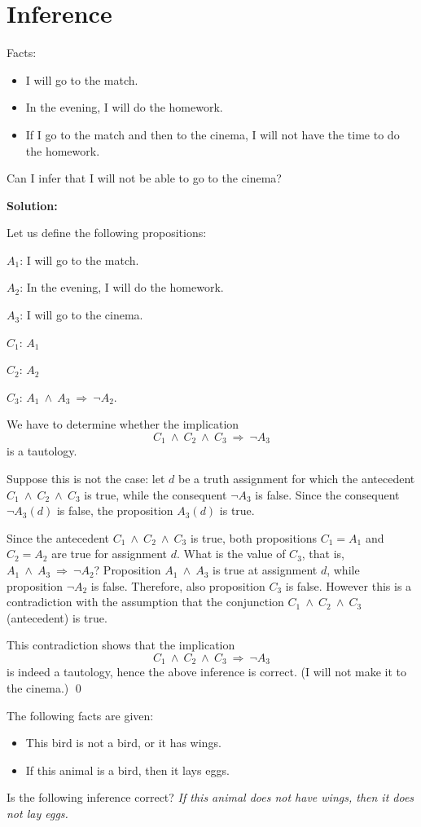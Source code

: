 \documentclass[11pt,paper=b5,footinclude,headinclude]{scrbook} %
\def\inn {{~\wedge~}}
\def\sledi {{~\Rightarrow~}}
\theoremstyle{remark}
\theoremstyle{definition} %
\theoremstyle{theorem} %
\begin{document}

\section{Inference}

Facts:
\begin{itemize}
  \item I will go to the match.
  \item In the evening, I will do the homework.
  \item If I go to the match and then to the cinema, I will not have the time to do the homework.
\end{itemize}
Can I infer that I will not be able to go to the cinema?

\medskip
\textbf{ Solution:}

Let us define the following propositions:

$A_1$: I will go to the match.

$A_2$: In the evening, I will do the homework.

$A_3$: I will go to the cinema.

$C_1$: $A_1$

$C_2$: $A_2$

$C_3$: $A_1\inn A_3\sledi \neg A_2$.

We have to determine whether the implication
$$C_1\inn C_2\inn C_3\sledi \neg A_3$$
is a tautology.


Suppose this is not the case: let $d$ be a truth assignment for which the antecedent
$C_1\inn C_2\inn C_3$ is true,
while the consequent $\neg A_3$ is false.
Since the consequent $\neg A_3(d)$ is false, the proposition $A_3(d)$ is true.

Since the antecedent $C_1\inn C_2\inn C_3$ is true, both propositions $C_1=A_1$ and $C_2=A_2$ are true for assignment $d$.
What is the value of $C_3$, that is,~$A_1\inn A_3\sledi \neg A_2$?
Proposition $A_1\inn A_3$ is true at assignment $d$, while proposition $\neg A_2$ is false. Therefore, also proposition $C_3$ is false.
However this is a contradiction with the assumption that the conjunction
$C_1\inn C_2\inn C_3$ (antecedent) is true.

This contradiction shows that the implication
$$C_1\inn C_2\inn C_3\sledi \neg A_3$$
is indeed a tautology, hence the above inference is correct. (I will not make it to the cinema.)
\qed

\bigskip

The following facts are given:
\begin{itemize}
  \item This bird is not a bird, or it has wings.
  \item If this animal is a bird, then it lays eggs.
\end{itemize}
Is the following inference correct?
{\em If this animal does not have wings, then it does not lay eggs.}
\end{document}
